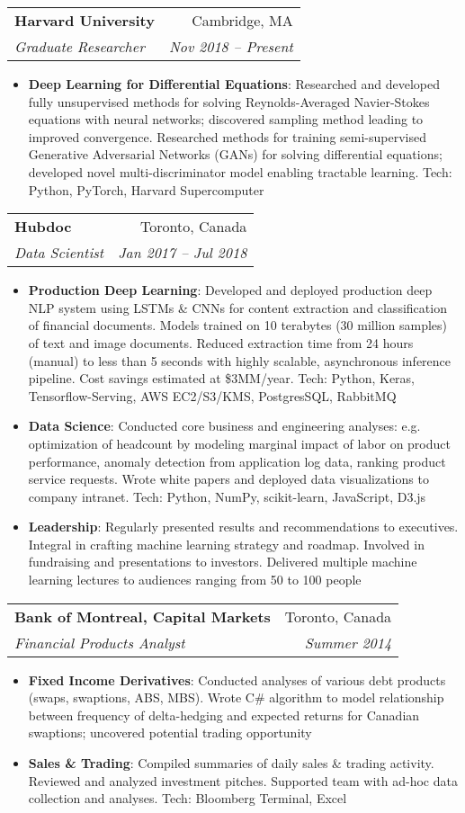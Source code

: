 \documentclass[letterpaper,11pt]{article}
\makeatletter
\newcommand{\resumeItem}[2]{
  \item\small{
    \textbf{#1}{: #2 \vspace{-2pt}}
  }
}
\newcommand{\resumeSubheading}[4]{
  \vspace{-1pt}\item
    \begin{tabular*}{0.97\textwidth}[t]{l@{\extracolsep{\fill}}r}
      \textbf{#1} & #2 \\
      \textit{\small#3} & \textit{\small #4} \\
    \end{tabular*}\vspace{-5pt}
}
\newcommand{\resumeItemListStart}{\begin{itemize}}
\newcommand{\resumeItemListEnd}{\end{itemize}\vspace{-5pt}}
\makeatother
\begin{document}
  \resumeSubheading
    {Harvard University}{Cambridge, MA}
    {Graduate Researcher}{Nov 2018 -- Present}
    \resumeItemListStart
      \resumeItem{Deep Learning for Differential Equations}
        {Researched and developed fully unsupervised methods for solving Reynolds-Averaged Navier-Stokes equations with
        neural networks; discovered sampling method leading to improved convergence. Researched methods for training
        semi-supervised Generative Adversarial Networks (GANs) for solving differential equations; developed novel
        multi-discriminator model enabling tractable learning. Tech: Python, PyTorch, Harvard Supercomputer}
    \resumeItemListEnd

    \resumeSubheading
      {Hubdoc}{Toronto, Canada}
      {Data Scientist}{Jan 2017 -- Jul 2018}
      \resumeItemListStart
        \resumeItem{Production Deep Learning}
          {Developed and deployed production deep NLP system using LSTMs \& CNNs for content extraction and
          classification of financial documents. Models trained on 10 terabytes (30 million samples) of text and image documents.
          Reduced extraction time from 24 hours (manual) to less than 5 seconds with highly scalable, asynchronous inference pipeline.
          Cost savings estimated at \$3MM/year. Tech: Python, Keras, Tensorflow-Serving, AWS EC2/S3/KMS, PostgresSQL, RabbitMQ}
        \resumeItem{Data Science}
          {Conducted core business and engineering analyses: e.g. optimization of headcount by modeling marginal impact of labor
          on product performance, anomaly detection from application log data, ranking product service requests. Wrote white papers and
          deployed data visualizations to company intranet. Tech: Python, NumPy, scikit-learn, JavaScript, D3.js}
        \resumeItem{Leadership}
          {Regularly presented results and recommendations to executives. Integral in crafting machine learning strategy and
          roadmap. Involved in fundraising and presentations to investors. Delivered multiple machine learning lectures to
          audiences ranging from 50 to 100 people}
      \resumeItemListEnd

    \resumeSubheading
      {Bank of Montreal, Capital Markets}{Toronto, Canada}
      {Financial Products Analyst}{Summer 2014}
      \resumeItemListStart
        \resumeItem{Fixed Income Derivatives}
          {Conducted analyses of various debt products (swaps, swaptions, ABS, MBS). Wrote C\# algorithm
          to model relationship between frequency of delta-hedging and expected returns for Canadian swaptions;
          uncovered potential trading opportunity}
        \resumeItem{Sales \& Trading}
          {Compiled summaries of daily sales \& trading activity. Reviewed and analyzed investment pitches. Supported
          team with ad-hoc data collection and analyses. Tech: Bloomberg Terminal, Excel}
      \resumeItemListEnd
\end{document}

